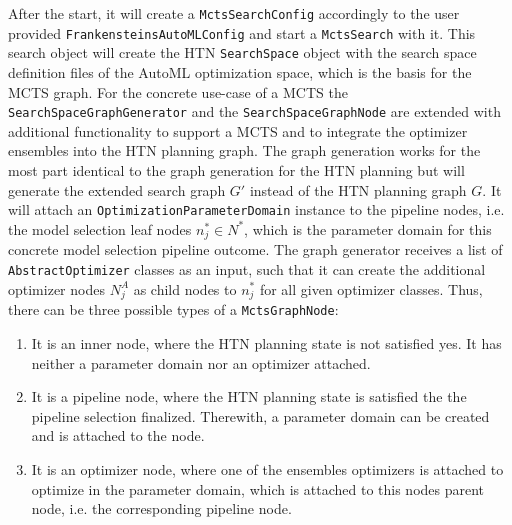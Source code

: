 After the start, it will create a \texttt{MctsSearchConfig} accordingly to the user provided \texttt{FrankensteinsAutoMLConfig} and start a \texttt{MctsSearch} with it.
This search object will create the HTN \texttt{SearchSpace} object with the search space definition files of the AutoML optimization space, which is the basis for the MCTS graph.\newline
For the concrete use-case of a MCTS the \texttt{SearchSpaceGraphGenerator} and the \texttt{SearchSpaceGraphNode} are extended with additional functionality to support a MCTS and to integrate the optimizer ensembles into the HTN planning graph.
The graph generation works for the most part identical to the graph generation for the HTN planning but will generate the extended search graph $G'$ instead of the HTN planning graph $G$.
It will attach an \texttt{OptimizationParameterDomain} instance to the pipeline nodes, i.e. the model selection leaf nodes $n^*_j \in N^*$, which is the parameter domain for this concrete model selection pipeline outcome.
The graph generator receives a list of \texttt{AbstractOptimizer} classes as an input, such that it can create the additional optimizer nodes $N^A_j$ as child nodes to $n^*_j$ for all given optimizer classes.\newline
Thus, there can be three possible types of a \texttt{MctsGraphNode}:
\begin{enumerate}
    \item It is an inner node, where the HTN planning state is not satisfied yes. It has neither a parameter domain nor an optimizer attached.
    \item It is a pipeline node, where the HTN planning state is satisfied the the pipeline selection finalized. Therewith, a parameter domain can be created and is attached to the node.
    \item It is an optimizer node, where one of the ensembles optimizers is attached to optimize in the parameter domain, which is attached to this nodes parent node, i.e. the corresponding pipeline node.
\end{enumerate}

